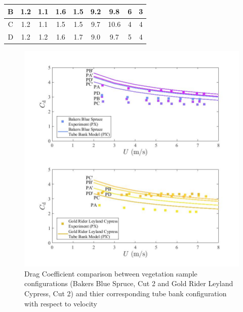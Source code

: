 \documentclass[12pt]{article}
\begin{document}
\begin{table}[!]
\begin{tabular}{|c|c|c|c|c|c|c|c|c|}
    B                            & 1.2          & 1.1      & 1.6                  & 1.5                & 9.2               & 9.8        & 6                           & 3                                \\ \hline
    C                            & 1.2            & 1.1     & 1.5                  & 1.5                & 9.7               & 10.6       & 4                           & 4                                \\ \hline
    D                            & 1.2            & 1.2      & 1.6                  & 1.7                & 9.0               & 9.7        & 5                           & 4                                \\ \hline
    \end{tabular}
\end{table}

\begin{figure}[!]
	\centering 	
\includegraphics[width=1\linewidth]{Picture13.jpg}
	\caption[Drag Coefficient comparison between vegetation samples and tube bank configurations]{Drag Coefficient comparison between vegetation sample configurations (Bakers Blue Spruce, Cut 2 and Gold Rider Leyland Cypress, Cut 2) and thier corresponding tube bank configuration with respect to velocity}
	\label{fig:TBGR}
\end{figure}
\end{document}
